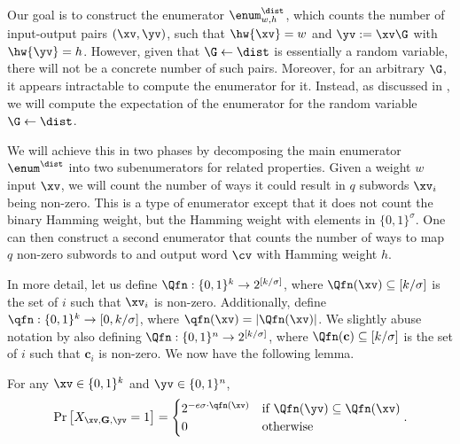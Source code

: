 Our goal is to construct the enumerator $\enum^\dist_{w,h}$, which counts the number of input-output pairs $(\xv,\yv)$, such that $\hw{\xv} = w$ and $\yv:=\xv\G$ with $\hw{\yv}=h$. However, given that $\G\gets \dist$ is essentially a random variable, there will not be a concrete number of such pairs. Moreover, for an arbitrary $\G$, it appears intractable to compute the enumerator for it. Instead, as discussed in , we will compute the expectation of the enumerator for the random variable $\G\gets\dist$.

We will achieve this in two phases by decomposing the main enumerator $\enum^{\dist}$ into two subenumerators for related properties. Given a weight $w$ input $\xv$, we will count the number of ways it could result in $q$ subwords $\xv_i$ being non-zero. This is a type of enumerator except that it does not count the binary Hamming weight, but the Hamming weight with elements in $\{0,1\}^\sigma$. One can then construct a second enumerator that counts the number of ways to map $q$ non-zero subwords to and output word $\cv$ with Hamming weight $h$.


In more detail, let us define $\Qfn:\{0,1\}^{k} \rightarrow 2^{[k/\sigma]}$, where $\Qfn(\xv) \subseteq [k/\sigma]$ is the set of $i$ such that $\xv_i$ is non-zero. Additionally, define $\qfn:\{0,1\}^{k} \rightarrow [0,k/\sigma]$, where $\qfn(\xv) =|\Qfn(\xv)|$. We slightly abuse notation by also defining $\Qfn:\{0,1\}^{n} \rightarrow 2^{[k/\sigma]}$, where $\Qfn(\mathbf{c}) \subseteq [k/\sigma]$ is the set of $i$ such that $\mathbf{c}_i$ is non-zero. We now have the following lemma.

\begin{lemma}
For any $\xv\in \{0,1\}^k$ and $\yv \in \{0,1\}^n$,$$
\Pr\left[X_{\xv, \mathbf{G}, \yv}=1\right] = \begin{cases}2^{-e\sigma\cdot\qfn(\xv)}&\textrm{if } \Qfn(\yv) \subseteq \Qfn(\xv)\\0&\textrm{otherwise}\end{cases}.$$

\end{lemma}

